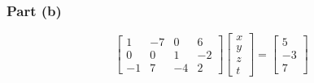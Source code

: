 \documentclass{report}
\begin{document}
\subsubsection*{Part (b)}
\begin{equation}
\begin{bmatrix}
1 & -7 & 0 & 6 \\ 
0 & 0 & 1 & -2 \\ 
-1 & 7 & -4 & 2 
\end{bmatrix}
\begin{bmatrix}
x \\ 
y \\ 
z \\
t
\end{bmatrix}
=
\begin{bmatrix} 
5 \\ 
-3 \\ 
7
\end{bmatrix}
\end{equation}
\end{document}
